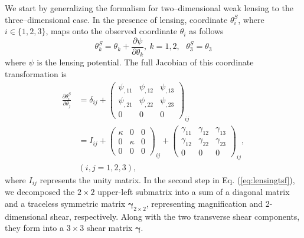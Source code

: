 We start by generalizing the formalism for two--dimensional weak lensing \cite{Weinberg201387} to the three--dimensional case.
In the presence of lensing, coordinate $\theta_i^S$, where $i\in\{1,2,3\}$, maps onto the observed coordinate $\theta_i$ as follows \begin{equation}
\theta_k^S=\theta_k+\frac{\partial\psi}{\partial\theta_k},\ k=1,2,\ \ \ \theta_3^S=\theta_3
\label{eq:lensingmapping}
\end{equation}
where $\psi$ is the lensing potential. The full Jacobian of this coordinate transformation is
\begin{align}
\frac{\partial\theta_i^S}{\partial\theta_j}&=\delta_{ij}+\left(\begin{array}{ccc}
\psi_{,11} & \psi_{,12} & \psi_{,13}\\
\psi_{,21} & \psi_{,22} & \psi_{,23}\\
0&0&0
\end{array}\right)_{ij} \nonumber\\
&= I_{ij} + \left(\begin{array}{ccc}
\kappa & 0 & 0\\
0 & \kappa & 0\\
0&0&0
\end{array}\right)_{ij}+\left(\begin{array}{ccc}
\gamma_{11} & \gamma_{12} & \gamma_{13}\\
\gamma_{12} & \gamma_{22} & \gamma_{23}\\
0&0&0
\end{array}\right)_{ij},\nonumber\\
&(i,j=1,2,3),
\label{eq:lensingtsf}
\end{align}
where $I_{ij}$ represents the unity matrix. In the second step in Eq. (\ref{eq:lensingtsf}), we decomposed the $2\times 2$ upper-left submatrix into a sum of a diagonal matrix and a traceless symmetric matrix $\bm{\gamma}_{2\times 2}$, representing magnification and 2-dimensional shear, respectively. Along with the two transverse shear components, they form into a $3\times 3$ shear matrix $\bm{\gamma}$.

